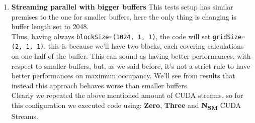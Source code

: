 \begin{enumerate}
	\item \textbf{Streaming parallel with bigger buffers}
	This tests setup has similar premises to the one for smaller buffers, here the only thing is changing is buffer length set to 2048.\\
	Thus, having always \texttt{blockSize=(1024, 1, 1)}, the code will set \texttt{gridSize=(2, 1, 1)}, this is because we'll have two blocks, each covering calculations on one half of the buffer.
	This can sound as having better performances, with respect to smaller buffers, but, as we said before, it's not a strict rule to have better performances on maximum occupancy.
	We'll see from results that instead this approach behaves worse than smaller buffers. \\
	Clearly we repeated the above mentioned amount of CUDA streams, so for this configuration we executed code using: \textbf{Zero}, \textbf{Three} and \textbf{N\textsubscript{SM}} CUDA Streams.



	
\end{enumerate}
